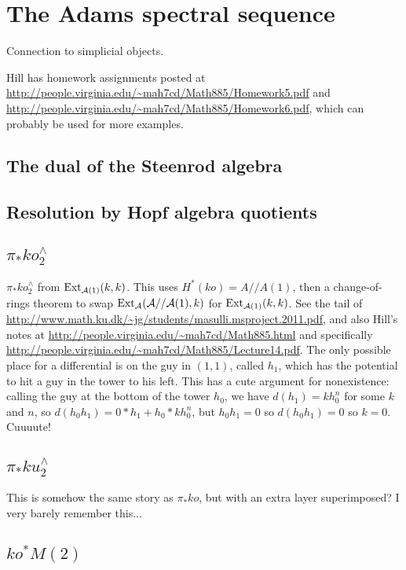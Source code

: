 \chapter{The Adams spectral sequence}

Connection to simplicial objects.

Hill has homework assignments posted at \url{http://people.virginia.edu/~mah7cd/Math885/Homework5.pdf} and \url{http://people.virginia.edu/~mah7cd/Math885/Homework6.pdf}, which can probably be used for more examples.

\section{The dual of the Steenrod algebra}

\section{Resolution by Hopf algebra quotients}

\section{$\pi_* ko^\wedge_2$}

$\pi_* ko^\wedge_{2}$ from $\operatorname{Ext}_{\mathcal{A}(1)}(k, k)$.  This uses $H^*(ko) = A // A(1)$, then a change-of-rings theorem to swap $\operatorname{Ext}_{\mathcal{A}}(\mathcal{A} // \mathcal{A}(1), k)$ for $\operatorname{Ext}_{\mathcal{A}(1)}(k, k)$.  See the tail of \url{http://www.math.ku.dk/~jg/students/masulli.msproject.2011.pdf}, and also Hill's notes at \url{http://people.virginia.edu/~mah7cd/Math885.html} and specifically \url{http://people.virginia.edu/~mah7cd/Math885/Lecture14.pdf}.  The only possible place for a differential is on the guy in $(1, 1)$, called $h_1$, which has the potential to hit a guy in the tower to his left.  This has a cute argument for nonexistence: calling the guy at the bottom of the tower $h_0$, we have $d(h_1) = k h_0^n$ for some $k$ and $n$, so $d(h_0 h_1) = 0 * h_1 + h_0 * k h_0^n$, but $h_0 h_1 = 0$ so $d(h_0 h_1) = 0$ so $k = 0$.  Cuuuute!

\section{$\pi_* ku^\wedge_2$}

This is somehow the same story as $\pi_* ko$, but with an extra layer superimposed?  I very barely remember this...

\section{$ko^* M(2)$}

